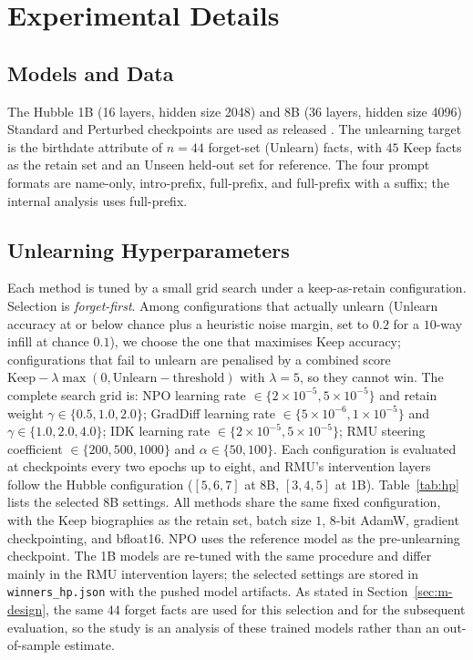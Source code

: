 \chapter{Experimental Details}
\label{app:details}

\section{Models and Data}
The Hubble 1B (16 layers, hidden size 2048) and 8B (36 layers, hidden size 4096) Standard and Perturbed
checkpoints are used as released \citep{allegro2025hubble}. The unlearning target is the birthdate
attribute of $n=44$ forget-set (Unlearn) facts, with $45$ Keep facts as the retain set and an Unseen
held-out set for reference. The four prompt formats are name-only, intro-prefix, full-prefix, and
full-prefix with a suffix; the internal analysis uses full-prefix.

\section{Unlearning Hyperparameters}
\label{app:hp}
Each method is tuned by a small grid search under a keep-as-retain configuration. Selection is
\emph{forget-first}. Among configurations that actually unlearn (Unlearn accuracy at or below chance plus a
heuristic noise margin, set to $0.2$ for a $10$-way infill at chance $0.1$), we choose the one that
maximises Keep accuracy;
configurations that fail to unlearn are penalised by a combined score
$\text{Keep} - \lambda\max(0,\text{Unlearn}-\text{threshold})$ with $\lambda=5$, so they cannot win. The
complete search grid is: NPO learning rate $\in\{2\times10^{-5}, 5\times10^{-5}\}$ and retain weight
$\gamma\in\{0.5,1.0,2.0\}$; GradDiff learning rate $\in\{5\times10^{-6}, 1\times10^{-5}\}$ and
$\gamma\in\{1.0,2.0,4.0\}$; IDK learning rate $\in\{2\times10^{-5}, 5\times10^{-5}\}$; RMU steering
coefficient $\in\{200,500,1000\}$ and $\alpha\in\{50,100\}$. Each configuration is evaluated at checkpoints
every two epochs up to eight, and RMU's intervention layers follow the Hubble configuration ($[5,6,7]$ at
8B, $[3,4,5]$ at 1B). Table~\ref{tab:hp} lists the selected 8B settings. All methods share the same fixed configuration, with the
Keep biographies as the retain set, batch size $1$, 8-bit AdamW, gradient checkpointing, and bfloat16. NPO
uses the reference model as the pre-unlearning checkpoint. The 1B models are re-tuned with the same
procedure and differ mainly in the RMU intervention layers; the selected settings are stored in
\texttt{winners\_hp.json} with the pushed model artifacts. As stated in Section~\ref{sec:m-design}, the same
$44$ forget facts are used for this selection and for the subsequent evaluation, so the study is an analysis
of these trained models rather than an out-of-sample estimate.

